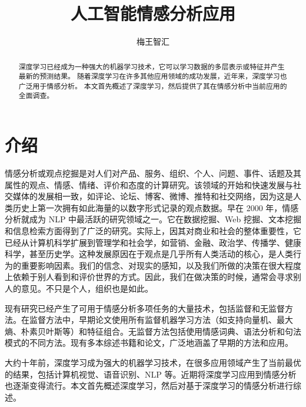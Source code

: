 \documentclass[lang=cn,11pt,a4paper]{elegantpaper}
\title{人工智能情感分析应用}
\author{梅王智汇}
\institute{(华中师范大学\ 武汉\ 430000)}
\date{}
\begin{document}
\maketitle
\thispagestyle{fancy}         %
\fancyhead{}                     %
\lfoot{}
\cfoot{\thepage}  %
\rfoot{}
\renewcommand{\headrulewidth}{0pt}      %
\renewcommand{\footrulewidth}{0pt}

\begin{abstract}
深度学习已经成为一种强大的机器学习技术，它可以学习数据的多层表示或特征并产生最新的预测结果。 随着深度学习在许多其他应用领域的成功发展，近年来，深度学习也广泛用于情感分析。 本文首先概述了深度学习，然后提供了其在情感分析中当前应用的全面调查。
\end{abstract}


\section{介绍}
情感分析或观点挖掘是对人们对产品、服务、组织、个人、问题、事件、话题及其属性的观点、情感、情绪、评价和态度的计算研究\cite{1}。该领域的开始和快速发展与社交媒体的发展相一致，如评论、论坛、博客、微博、推特和社交网络，因为这是人类历史上第一次拥有如此海量的以数字形式记录的观点数据。早在 2000 年，情感分析就成为 NLP 中最活跃的研究领域之一。它在数据挖掘、Web 挖掘、文本挖掘和信息检索方面得到了广泛的研究。实际上，因其对商业和社会的整体重要性，它已经从计算机科学扩展到管理学和社会学，如营销、金融、政治学、传播学、健康科学，甚至历史学。这种发展原因在于观点是几乎所有人类活动的核心，是人类行为的重要影响因素。我们的信念、对现实的感知，以及我们所做的决策在很大程度上依赖于别人看到和评价世界的方式。因此，我们在做决策的时候，通常会寻求别人的意见。不只是个人，组织也是如此。

现有研究已经产生了可用于情感分析多项任务的大量技术，包括监督和无监督方法。在监督方法中，早期论文使用所有监督机器学习方法（如支持向量机、最大熵、朴素贝叶斯等）和特征组合。无监督方法包括使用情感词典、语法分析和句法模式的不同方法。现有多本综述书籍和论文，广泛地涵盖了早期的方法和应用\cite{2,3}。

大约十年前，深度学习成为强大的机器学习技术，在很多应用领域产生了当前最优的结果，包括计算机视觉、语音识别、NLP 等。近期将深度学习应用到情感分析也逐渐变得流行。本文首先概述深度学习，然后对基于深度学习的情感分析进行综述。
\end{document}
